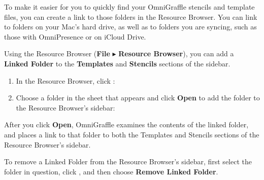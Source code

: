 \documentclass[../main.tex]{subfiles}
\begin{document}
To make it easier for you to quickly find your OmniGraffle stencils and template files, you can
create a link to those folders in the Resource Browser. You can link to folders on your Mac's
hard drive, as well as to folders you are syncing, such as those with OmniPresence or on
iCloud Drive.

Using the Resource Browser (\textbf{File} $\blacktriangleright$ \textbf{Resource Browser}), you
can add a \textbf{Linked Folder} to the \textbf{Templates} and \textbf{Stencils} sections of
the sidebar.

\begin{enumerate}
  \item In the Resource Browser, click :

  \item Choose a folder in the sheet that appears and click \textbf{Open} to add the folder to
    the Resource Browser's sidebar:

\end{enumerate}

After you click \textbf{Open}, OmniGraffle examines the contents of the linked folder, and
places a link to that folder to both the Templates and Stencils sections of the Resource
Browser's sidebar.


To remove a Linked Folder from the Resource Browser's sidebar, first select the folder in
question, click , and then choose
\textbf{Remove Linked Folder}.
\end{document}

